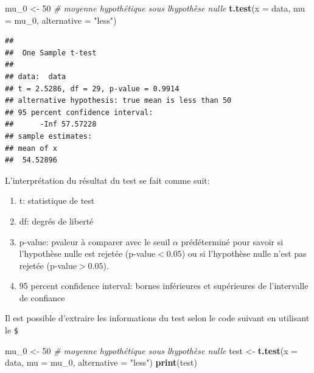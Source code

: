 \documentclass[
]{book}
\newenvironment{Shaded}{\begin{snugshade}}{\end{snugshade}}
\newcommand{\AttributeTok}[1]{\textcolor[rgb]{0.13,0.29,0.53}{#1}}
\newcommand{\CommentTok}[1]{\textcolor[rgb]{0.56,0.35,0.01}{\textit{#1}}}
\newcommand{\DecValTok}[1]{\textcolor[rgb]{0.00,0.00,0.81}{#1}}
\newcommand{\FunctionTok}[1]{\textcolor[rgb]{0.13,0.29,0.53}{\textbf{#1}}}
\newcommand{\NormalTok}[1]{#1}
\newcommand{\OtherTok}[1]{\textcolor[rgb]{0.56,0.35,0.01}{#1}}
\newcommand{\StringTok}[1]{\textcolor[rgb]{0.31,0.60,0.02}{#1}}
\providecommand{\tightlist}{%
  \setlength{\itemsep}{0pt}\setlength{\parskip}{0pt}}
\begin{document}
\begin{Shaded}
\begin{Highlighting}[]
\NormalTok{mu\_0 }\OtherTok{\textless{}{-}} \DecValTok{50}  \CommentTok{\# moyenne hypothétique sous l\textquotesingle{}hypothèse nulle }
\FunctionTok{t.test}\NormalTok{(}\AttributeTok{x =}\NormalTok{ data, }\AttributeTok{mu =}\NormalTok{ mu\_0, }\AttributeTok{alternative =} \StringTok{"less"}\NormalTok{)}
\end{Highlighting}
\end{Shaded}

\begin{verbatim}
## 
##  One Sample t-test
## 
## data:  data
## t = 2.5286, df = 29, p-value = 0.9914
## alternative hypothesis: true mean is less than 50
## 95 percent confidence interval:
##      -Inf 57.57228
## sample estimates:
## mean of x 
##  54.52896
\end{verbatim}

L'interprétation du résultat du test se fait comme suit:

\begin{enumerate}
\def\labelenumi{\arabic{enumi}.}
\tightlist
\item
  t: statistique de test
\item
  df: degrés de liberté
\item
  p-value: pvaleur à comparer avec le seuil \(\alpha\) prédéterminé pour savoir si l'hypothèse nulle est rejetée (p-value\(<0.05\)) ou si l'hypothèse nulle n'est pas rejetée (p-value\(>0.05\)).
\item
  95 percent confidence interval: bornes inférieures et supérieures de l'intervalle de confiance
\end{enumerate}

Il est possible d'extraire les informations du test selon le code suivant en utilisant le \texttt{\$}

\begin{Shaded}
\begin{Highlighting}[]
\NormalTok{mu\_0 }\OtherTok{\textless{}{-}} \DecValTok{50}  \CommentTok{\# moyenne hypothétique sous l\textquotesingle{}hypothèse nulle }
\NormalTok{test }\OtherTok{\textless{}{-}} \FunctionTok{t.test}\NormalTok{(}\AttributeTok{x =}\NormalTok{ data, }\AttributeTok{mu =}\NormalTok{ mu\_0, }\AttributeTok{alternative =} \StringTok{"less"}\NormalTok{)}
\FunctionTok{print}\NormalTok{(test)}
\end{Highlighting}
\end{Shaded}
\end{document}
